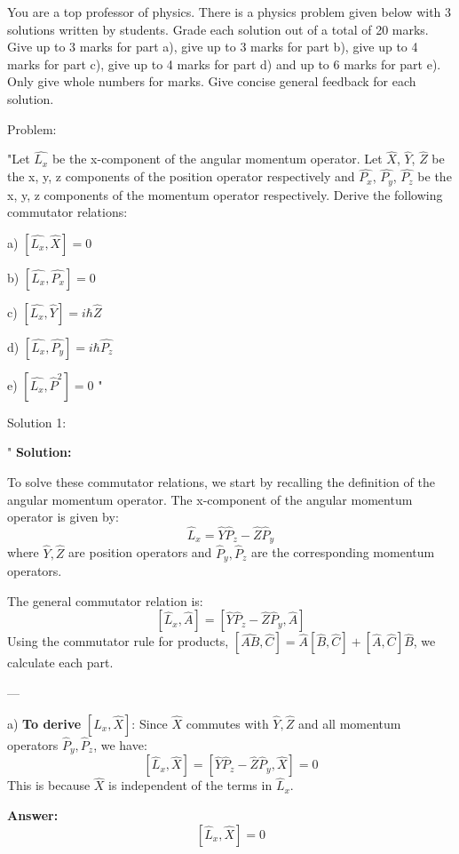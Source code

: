 You are a top professor of physics. There is a physics problem given below with 3 solutions written by students. Grade each solution out of a total of 20 marks. Give up to 3 marks for part a), give up to 3 marks for part b), give up to 4 marks for part c), give up to 4 marks for part d) and up to 6 marks for part e). Only give whole numbers for marks. Give concise general feedback for each solution. 

Problem:

"Let \( \hat{L_{x}} \) be the x-component of the angular momentum operator. Let \( \hat{X} \), \( \hat{Y} \), \( \hat{Z} \) be the x, y, z components of the position operator respectively and \( \hat{P_{x}} \), \( \hat{P_{y}} \), \( \hat{P_{z}} \)  be the x, y, z components of the momentum operator respectively. Derive the following commutator relations:

a) \( \left[ \hat{L_{x}}, \hat{X} \right] = 0 \)

b) \( \left[ \hat{L_{x}}, \hat{P_{x}} \right] = 0 \)

c) \( \left[ \hat{L_{x}}, \hat{Y} \right] = i \hbar \hat{Z} \)

d) \( \left[ \hat{L_{x}}, \hat{P_{y}} \right] = i \hbar \hat{P_{z}} \)

e) \( \left[ \hat{L_{x}}, \hat{P}^{2} \right] = 0 \) "

Solution 1: 

"
\textbf{Solution:}

To solve these commutator relations, we start by recalling the definition of the angular momentum operator. The x-component of the angular momentum operator is given by:
\[
\hat{L}_x = \hat{Y}\hat{P}_z - \hat{Z}\hat{P}_y
\]
where $\hat{Y}, \hat{Z}$ are position operators and $\hat{P}_y, \hat{P}_z$ are the corresponding momentum operators.

The general commutator relation is:
\[
[\hat{L}_x, \hat{A}] = [\hat{Y}\hat{P}_z - \hat{Z}\hat{P}_y, \hat{A}]
\]
Using the commutator rule for products, $[\hat{AB}, \hat{C}] = \hat{A}[\hat{B}, \hat{C}] + [\hat{A}, \hat{C}]\hat{B}$, we calculate each part.

---

a) \textbf{To derive} $\left[\hat{L}_x, \hat{X}\right]$:  
Since $\hat{X}$ commutes with $\hat{Y}, \hat{Z}$ and all momentum operators $\hat{P}_y, \hat{P}_z$, we have:
\[
[\hat{L}_x, \hat{X}] = [\hat{Y}\hat{P}_z - \hat{Z}\hat{P}_y, \hat{X}] = 0
\]
This is because $\hat{X}$ is independent of the terms in $\hat{L}_x$.  

\textbf{Answer:}
\[
\left[\hat{L}_x, \hat{X}\right] = 0
\]

